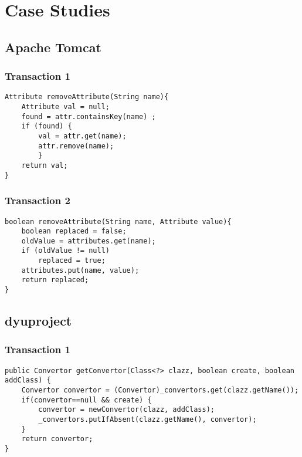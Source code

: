 \section{Case Studies}
\label{appendix:casestudies}

\subsection{Apache Tomcat}

\subsubsection{Transaction 1}
\begin{lstlisting}
Attribute removeAttribute(String name){
	Attribute val = null;
	found = attr.containsKey(name) ;
	if (found) {
		val = attr.get(name);
		attr.remove(name);
		}
	return val;
}
\end{lstlisting}

%
%
%
%

\subsubsection{Transaction 2}
\begin{lstlisting}
boolean removeAttribute(String name, Attribute value){
	boolean replaced = false;
	oldValue = attributes.get(name);
	if (oldValue != null)
		replaced = true;
	attributes.put(name, value);
	return replaced;
}
\end{lstlisting}


%
%
%

\subsection{dyuproject}

\subsubsection{Transaction 1}
\begin{lstlisting}
public Convertor getConvertor(Class<?> clazz, boolean create, boolean addClass) {
	Convertor convertor = (Convertor)_convertors.get(clazz.getName());
	if(convertor==null && create) {
		convertor = newConvertor(clazz, addClass);
		_convertors.putIfAbsent(clazz.getName(), convertor);
	}
	return convertor;
}
\end{lstlisting}


